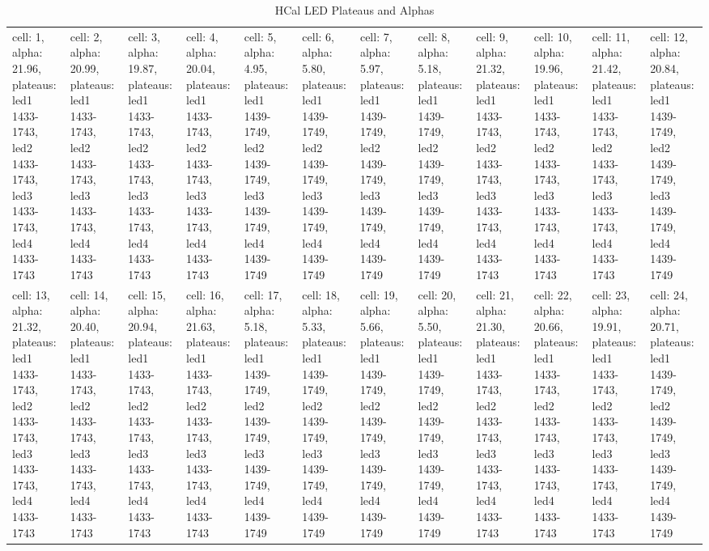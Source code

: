 \begin{landscape}
\scriptsize
\begin{longtable}{|l|l|l|l|l|l|l|l|l|l|l|l|}\caption{HCal LED Plateaus and Alphas}\label{tab:hcalalphas} \\
\rowcolor{lightgray} cell: 1, alpha: 21.96, plateaus: led1 1433-1743, led2 1433-1743, led3 1433-1743, led4 1433-1743 &cell: 2, alpha: 20.99, plateaus: led1 1433-1743, led2 1433-1743, led3 1433-1743, led4 1433-1743 &cell: 3, alpha: 19.87, plateaus: led1 1433-1743, led2 1433-1743, led3 1433-1743, led4 1433-1743 &cell: 4, alpha: 20.04, plateaus: led1 1433-1743, led2 1433-1743, led3 1433-1743, led4 1433-1743 &cell: 5, alpha: 4.95, plateaus: led1 1439-1749, led2 1439-1749, led3 1439-1749, led4 1439-1749 &cell: 6, alpha: 5.80, plateaus: led1 1439-1749, led2 1439-1749, led3 1439-1749, led4 1439-1749 &cell: 7, alpha: 5.97, plateaus: led1 1439-1749, led2 1439-1749, led3 1439-1749, led4 1439-1749 &cell: 8, alpha: 5.18, plateaus: led1 1439-1749, led2 1439-1749, led3 1439-1749, led4 1439-1749 &cell: 9, alpha: 21.32, plateaus: led1 1433-1743, led2 1433-1743, led3 1433-1743, led4 1433-1743 &cell: 10, alpha: 19.96, plateaus: led1 1433-1743, led2 1433-1743, led3 1433-1743, led4 1433-1743 &cell: 11, alpha: 21.42, plateaus: led1 1433-1743, led2 1433-1743, led3 1433-1743, led4 1433-1743 &cell: 12, alpha: 20.84, plateaus: led1 1439-1749, led2 1439-1749, led3 1439-1749, led4 1439-1749 \\
cell: 13, alpha: 21.32, plateaus: led1 1433-1743, led2 1433-1743, led3 1433-1743, led4 1433-1743 &cell: 14, alpha: 20.40, plateaus: led1 1433-1743, led2 1433-1743, led3 1433-1743, led4 1433-1743 &cell: 15, alpha: 20.94, plateaus: led1 1433-1743, led2 1433-1743, led3 1433-1743, led4 1433-1743 &cell: 16, alpha: 21.63, plateaus: led1 1433-1743, led2 1433-1743, led3 1433-1743, led4 1433-1743 &cell: 17, alpha: 5.18, plateaus: led1 1439-1749, led2 1439-1749, led3 1439-1749, led4 1439-1749 &cell: 18, alpha: 5.33, plateaus: led1 1439-1749, led2 1439-1749, led3 1439-1749, led4 1439-1749 &cell: 19, alpha: 5.66, plateaus: led1 1439-1749, led2 1439-1749, led3 1439-1749, led4 1439-1749 &cell: 20, alpha: 5.50, plateaus: led1 1439-1749, led2 1439-1749, led3 1439-1749, led4 1439-1749 &cell: 21, alpha: 21.30, plateaus: led1 1433-1743, led2 1433-1743, led3 1433-1743, led4 1433-1743 &cell: 22, alpha: 20.66, plateaus: led1 1433-1743, led2 1433-1743, led3 1433-1743, led4 1433-1743 &cell: 23, alpha: 19.91, plateaus: led1 1433-1743, led2 1433-1743, led3 1433-1743, led4 1433-1743 &cell: 24, alpha: 20.71, plateaus: led1 1439-1749, led2 1439-1749, led3 1439-1749, led4 1439-1749 \\

\end{longtable}
\end{landscape}
